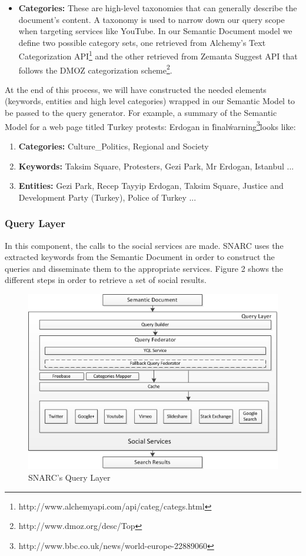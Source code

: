 \documentclass[onecolumn, crcready]{iosart2c}
\begin{document}
\begin{enumerate}
\begin{itemize}
\item {\bf Categories:} These are high-level taxonomies that can generally describe the document's content. A taxonomy is used to narrow down our query scope when targeting services like YouTube. In our Semantic Document model we define two possible category sets, one retrieved from Alchemy's Text Categorization API\footnote{http://www.alchemyapi.com/api/categ/categs.html} and the other retrieved from Zemanta Suggest API that follows the DMOZ categorization scheme\footnote{http://www.dmoz.org/desc/Top}.
\end{itemize}
\end{enumerate}
At the end of this process, we will have constructed the needed elements (keywords, entities and high level categories) wrapped in our Semantic Model to be passed to the query generator. For example, a summary of the Semantic Model for a web page titled \"Turkey protests: Erdogan in \'final\' warning\footnote{http://www.bbc.co.uk/news/world-europe-22889060}\"  looks like: 
\begin{enumerate}
\item {\bf Categories:} Culture\_Politics, Regional and Society
\item {\bf Keywords:} Taksim Square, Protesters, Gezi Park, Mr Erdogan, Istanbul ...
\item {\bf Entities:} Gezi Park, Recep Tayyip Erdogan, Taksim Square, Justice and Development Party (Turkey), Police of Turkey ...
\end{enumerate}

\subsubsection{Query Layer}
In this component, the calls to the social services are made. SNARC uses the extracted keywords from the Semantic Document in order to construct the queries and disseminate them to the appropriate services. Figure 2 shows the different steps in order to retrieve a set of social results.
\begin{figure}[ht!]
  \centering
    \includegraphics[scale=0.75]{architecture-part2.png}
  \caption{SNARC's Query Layer}
\end{figure}
\end{document}

